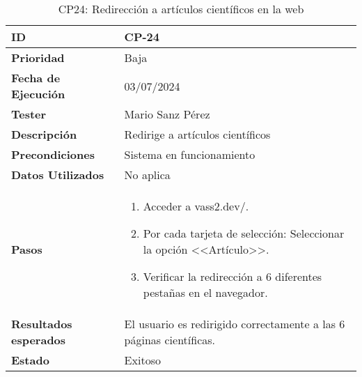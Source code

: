 \begin{table}[ht]
	\centering
	\renewcommand{\arraystretch}{1.5} %
	\begin{tabular}{>{\raggedright\arraybackslash}p{4cm} p{9.5cm}}
    \hline
    \rowcolor{gray!20}
    \textbf{ID} & CP-24\\
    \hline
    \rowcolor{white}
    \textbf{Prioridad} & Baja \\
    \hline
    \rowcolor{gray!20}
    \textbf{Fecha de Ejecución} & 03/07/2024 \\
    \hline
    \rowcolor{white}
    \textbf{Tester} & Mario Sanz Pérez \\
    \hline
    \rowcolor{gray!20}
    \textbf{Descripción} & Redirige a artículos científicos\\
    \hline
    \rowcolor{white}
    \textbf{Precondiciones} & Sistema en funcionamiento\\
    \hline
    \rowcolor{white}
    \textbf{Datos Utilizados} & No aplica\\
    \hline
    \rowcolor{gray!20}
    \textbf{Pasos} & \begin{enumerate}
        \item Acceder a vass2.dev/.
        \item Por cada tarjeta de selección: Seleccionar la opción <<Artículo>>.
        \item Verificar la redirección a 6 diferentes pestañas en el navegador.
    \end{enumerate}\\
	\hline
    \rowcolor{gray!20}
    \textbf{Resultados esperados} & El usuario es redirigido correctamente a las 6 páginas científicas.\\
    \hline
    \rowcolor{white}
    \textbf{Estado} & Exitoso\\
    \hline
\end{tabular}
	\caption[CP24: Redirección a artículos]{CP24: Redirección a artículos científicos en la web}
\end{table}

